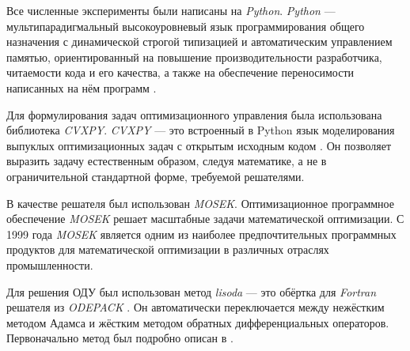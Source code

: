 \begin{comment}
		{Q}_1{N}_1\T \\0
	\end{bmatrix}\T \\ \leq  \frac{1}{\epsilon_3}\begin{bmatrix}
		{Q}_1{N}_1\T \\0
	\end{bmatrix}\begin{bmatrix}
		{Q}_1{N}_1\T \\ 0
	\end{bmatrix}\T +\epsilon_3 \begin{bmatrix}
		0 \\ {P}_2{S}{M}_1
	\end{bmatrix}\begin{bmatrix}
		0 \\ {P}_2{S}{M}_1
	\end{bmatrix}\T.
\end{multline}
%
Подставляя \eqref{eq:thm1_term_1},\eqref{eq:thm1_term_2} и \eqref{eq:thm1_term_3} в \eqref{eq:Young_expand} получаем выражение \eqref{eq:thm1_LMI_after_Young}.

\clearpage
\refstepcounter{chapter}

\end{comment}
Все численные эксперименты были написаны на \textit{Python}.
\textit{Python} --- мультипарадигмальный высокоуровневый язык программирования общего назначения с динамической строгой типизацией и автоматическим управлением памятью, ориентированный на повышение производительности разработчика, читаемости кода и его качества, а также на обеспечение переносимости написанных на нём программ \cite{python}.

Для формулирования задач оптимизационного управления была использована библиотека \textit{CVXPY}.
\textit{CVXPY} --- это встроенный в Python язык моделирования выпуклых оптимизационных задач с открытым исходным кодом \cite{cvxpy}. Он позволяет выразить задачу естественным образом, следуя математике, а не в ограничительной стандартной форме, требуемой решателями.

В качестве решателя был использован \textit{MOSEK}.
Оптимизационное программное обеспечение \textit{MOSEK} \cite{mosek} решает масштабные задачи математической оптимизации. С 1999 года \textit{MOSEK} является одним из наиболее предпочтительных программных продуктов для математической оптимизации в различных отраслях промышленности. 

Для решения ОДУ был использован метод \textit{lisoda} --- это обёртка для \textit{Fortran} решателя из \textit{ODEPACK} \cite{Hindmarsh}. Он автоматически переключается между нежёстким методом Адамса и жёстким методом обратных дифференциальных операторов. Первоначально метод был подробно описан в \cite{Petzold}.

